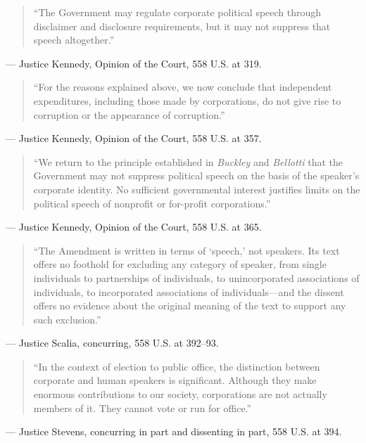 \documentclass[12pt]{article}
\begin{document}
\begin{quote}
``The Government may regulate corporate political speech through disclaimer and disclosure requirements, but it may not suppress that speech altogether.''
\end{quote}
\noindent --- Justice Kennedy, Opinion of the Court, 558 U.S. at 319.

\begin{quote}
``For the reasons explained above, we now conclude that independent expenditures, including those made by corporations, do not give rise to corruption or the appearance of corruption.''
\end{quote}
\noindent --- Justice Kennedy, Opinion of the Court, 558 U.S. at 357.

\begin{quote}
``We return to the principle established in \textit{Buckley} and \textit{Bellotti} that the Government may not suppress political speech on the basis of the speaker's corporate identity. No sufficient governmental interest justifies limits on the political speech of nonprofit or for-profit corporations.''
\end{quote}
\noindent --- Justice Kennedy, Opinion of the Court, 558 U.S. at 365.

\begin{quote}
``The Amendment is written in terms of `speech,' not speakers. Its text offers no foothold for excluding any category of speaker, from single individuals to partnerships of individuals, to unincorporated associations of individuals, to incorporated associations of individuals---and the dissent offers no evidence about the original meaning of the text to support any such exclusion.''
\end{quote}
\noindent --- Justice Scalia, concurring, 558 U.S. at 392--93.

\begin{quote}
``In the context of election to public office, the distinction between corporate and human speakers is significant. Although they make enormous contributions to our society, corporations are not actually members of it. They cannot vote or run for office.''
\end{quote}
\noindent --- Justice Stevens, concurring in part and dissenting in part, 558 U.S. at 394.
\end{document}
